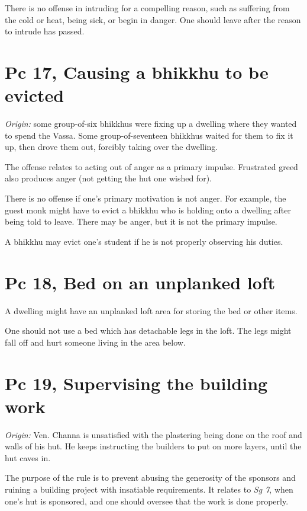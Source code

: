 There is no offense in intruding for a compelling reason, such as
suffering from the cold or heat, being sick, or begin in danger. One
should leave after the reason to intrude has passed.

\clearpage

\section{Pc 17, Causing a bhikkhu to be evicted}

\emph{Origin:} some group-of-six bhikkhus were fixing up a dwelling
where they wanted to spend the Vassa. Some group-of-seventeen bhikkhus
waited for them to fix it up, then drove them out, forcibly taking over
the dwelling.

The offense relates to acting out of anger as a primary impulse.
Frustrated greed also produces anger (not getting the hut one wished
for).

There is no offense if one's primary motivation is not anger. For
example, the guest monk might have to evict a bhikkhu who is holding
onto a dwelling after being told to leave. There may be anger, but it is
not the primary impulse.

A bhikkhu may evict one's student if he is not properly observing his
duties.

\section{Pc 18, Bed on an unplanked loft}

A dwelling might have an unplanked loft area for storing the bed or
other items.

One should not use a bed which has detachable legs in the loft. The legs
might fall off and hurt someone living in the area below.

\section{Pc 19, Supervising the building work}

\emph{Origin:} Ven. Channa is unsatisfied with the plastering being done
on the roof and walls of his hut. He keeps instructing the builders to
put on more layers, until the hut caves in.

The purpose of the rule is to prevent abusing the generosity of the
sponsors and ruining a building project with insatiable requirements. It
relates to \emph{Sg 7}, when one's hut is sponsored, and one should
oversee that the work is done properly.


